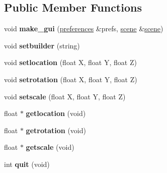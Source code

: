 \subsection*{Public Member Functions}
\begin{DoxyCompactItemize}
\item 
\mbox{\label{classgui_a1a5906415ded816116a23822bd73b5f1}} 
void {\bfseries make\+\_\+gui} (\hyperlink{classpreferences}{preferences} \&prefs, \hyperlink{classscene}{scene} \&\hyperlink{classscene}{scene})
\item 
\mbox{\label{classgui_a6210811d6e2a5db2cf1548958a37dec0}} 
void {\bfseries setbuilder} (string)
\item 
\mbox{\label{classgui_a4caa9c72cc2853eb33900ac74a0668ea}} 
void {\bfseries setlocation} (float X, float Y, float Z)
\item 
\mbox{\label{classgui_a43f6b66a4b1e8413bc28acd61302220a}} 
void {\bfseries setrotation} (float X, float Y, float Z)
\item 
\mbox{\label{classgui_a47621e87cba0dd748d224a50dfff8673}} 
void {\bfseries setscale} (float X, float Y, float Z)
\item 
\mbox{\label{classgui_afd6c47114356e9a7954687b5dc3297f4}} 
float $\ast$ {\bfseries getlocation} (void)
\item 
\mbox{\label{classgui_a4c57f420b452008a9972402555ed33ea}} 
float $\ast$ {\bfseries getrotation} (void)
\item 
\mbox{\label{classgui_a405ae67b3bc3a608c0dcf6dbe65139e8}} 
float $\ast$ {\bfseries getscale} (void)
\item 
\mbox{\label{classgui_a6b85b911cd3f2c6b71db91c4f07992bf}} 
int {\bfseries quit} (void)
\end{DoxyCompactItemize}
